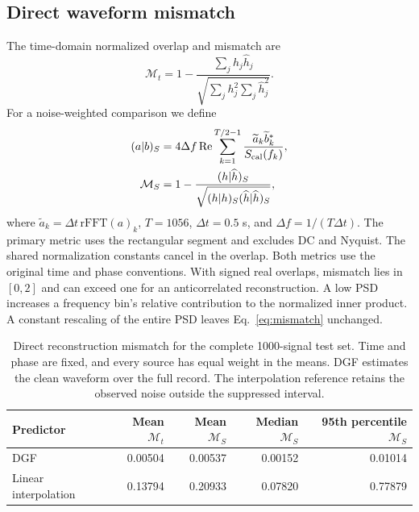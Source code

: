 \documentclass[10pt,prd,aps,a4paper,twocolumn,superscriptaddress,nofootinbib,floatfix]{revtex4-2}
\begin{document}
\subsection{Direct waveform mismatch}\label{subsec:Mismatch}
The time-domain normalized overlap and mismatch are
\begin{equation}
\mathcal M_t=1-\frac{\sum_jh_j\widehat h_j}{\sqrt{\sum_jh_j^2\sum_j\widehat h_j^2}}.
\end{equation}
For a noise-weighted comparison we define
\begin{align}
(a|b)_S&=4\Delta f\operatorname{Re}\sum_{k=1}^{T/2-1}\frac{\widetilde a_k\widetilde b_k^*}{S_{\rm cal}(f_k)},\\
\mathcal M_S&=1-\frac{(h|\widehat h)_S}{\sqrt{(h|h)_S(\widehat h|\widehat h)_S}},\label{eq:mismatch}
\end{align}
where $\widetilde a_k=\Delta t\,\mathrm{rFFT}(a)_k$, $T=1056$, $\Delta t=0.5$ s, and $\Delta f=1/(T\Delta t)$. The primary metric uses the rectangular segment and excludes DC and Nyquist. The shared normalization constants cancel in the overlap. Both metrics use the original time and phase conventions. With signed real overlaps, mismatch lies in $[0,2]$ and can exceed one for an anticorrelated reconstruction. A low PSD increases a frequency bin's relative contribution to the normalized inner product. A constant rescaling of the entire PSD leaves Eq.~\eqref{eq:mismatch} unchanged.

\begin{table}[t]\centering
\caption{Direct reconstruction mismatch for the complete 1000-signal test set. Time and phase are fixed, and every source has equal weight in the means. DGF estimates the clean waveform over the full record. The interpolation reference retains the observed noise outside the suppressed interval.}\label{tab:results}
\begin{tabular}{lrrrr}\hline\hline
Predictor & Mean $\mathcal M_t$ & Mean $\mathcal M_S$ & Median $\mathcal M_S$ & 95th percentile $\mathcal M_S$\\\hline
DGF & 0.00504 & 0.00537 & 0.00152 & 0.01014 \\
Linear interpolation & 0.13794 & 0.20933 & 0.07820 & 0.77879 \\
\hline\hline\end{tabular}\end{table}
\end{document}
